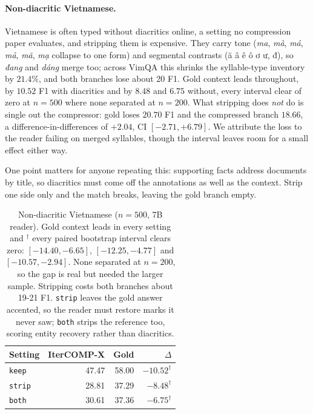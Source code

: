 \documentclass{llncs}
\begin{document}
\paragraph{Non-diacritic Vietnamese.} Vietnamese is often typed without diacritics
online, a setting no compression paper evaluates, and stripping them is
expensive. They carry tone (\emph{ma}, \emph{mà}, \emph{má}, \emph{mả},
\emph{mã}, \emph{mạ} collapse to one form) and segmental contrasts (ă â ê ô ơ ư,
đ), so \emph{đang} and \emph{dáng} merge too; across VimQA this shrinks the
syllable-type inventory by $21.4\%$, and both branches lose about 20 F1. Gold context leads throughout, by $10.52$ F1 with
diacritics and by $8.48$ and $6.75$ without, every interval clear of zero at
$n=500$ where none separated at $n=200$. What stripping does \emph{not} do is
single out the compressor: gold loses $20.70$ F1 and the compressed branch
$18.66$, a difference-in-differences of $+2.04$, CI $[-2.71,+6.79]$. We attribute the loss to the reader failing on merged
syllables, though the interval leaves room for a small effect either way.

One point matters for anyone repeating this: supporting facts address
documents by title, so diacritics must come off the annotations as well as the
context. Strip one side only and the match breaks, leaving the gold branch
empty.

\begin{table}[htbp]
\centering
\caption{Non-diacritic Vietnamese ($n=500$, 7B reader). Gold context leads in
every setting and $^\dag$ every paired bootstrap interval clears zero:
$[-14.40,-6.65]$, $[-12.25,-4.77]$ and $[-10.57,-2.94]$. None separated at $n=200$, so the gap is real but
needed the larger sample. Stripping costs both branches about 19-21 F1.
\texttt{strip} leaves the gold answer accented, so the reader must restore marks
it never saw; \texttt{both} strips the reference too, scoring entity recovery
rather than diacritics.}
\label{tab:undia}
\small
\setlength{\tabcolsep}{7pt}
\begin{tabular}{lrrr}
\toprule
Setting & IterCOMP-X & Gold & $\Delta$ \\
\midrule
\texttt{keep}  & 47.47 & 58.00 & $-10.52^\dag$ \\
\texttt{strip} & 28.81 & 37.29 & $-8.48^\dag$ \\
\texttt{both}  & 30.61 & 37.36 & $-6.75^\dag$ \\
\bottomrule
\end{tabular}
\end{table}
\end{document}
